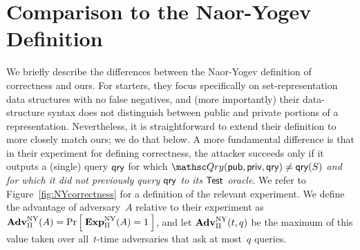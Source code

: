 \section{Comparison to the Naor-Yogev Definition}
\label{sec:compare-defs}
We briefly describe the differences between the Naor-Yogev definition of correctness and ours.
For starters,
they focus specifically on set-representation data
structures with no false negatives, and (more importantly) their data-structure syntax
does not distinguish between public and private portions of a
representation. Nevertheless, it is straightforward
to extend their definition to more closely match ours; we do that below.
A more fundamental difference is that in
their experiment for defining correctness, the attacker
succeeds only if it outputs a (single) query $\mathsf{qry}$ for which
$\Qry(\pubaux,\privaux, \qry) \neq \qry(S)$  \emph{and for which it did not
previously query $\mathsf{qry}$ to its $\mathsf{Test}$ oracle}. We refer to
Figure~\ref{fig:NYcorrectness} for a definition of the relevant experiment.
We define the advantage of adversary~$A$ relative to their experiment
as
$\mathrm{\mathbf{Adv}}^{\mathrm{NY}}_{\Pi}(A) = \Pr\left[\: \mathrm{\mathbf{Exp}}^{\mathrm{NY}}_{\Pi}(A)=1 \:\right]$,
and let $\mathrm{\mathbf{Adv}}^{\mathrm{NY}}_{\Pi}(t,q)$ be the maximum of this value taken over
all~$t$-time adversaries that ask at most~$q$ queries. %


